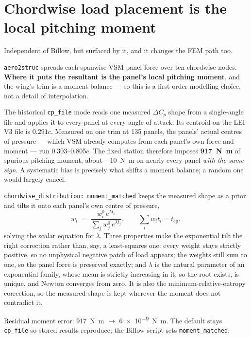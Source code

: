 \documentclass[11pt,a4paper]{article}
\newcommand{\code}[1]{\texttt{\small #1}}
\begin{document}
\section{Chordwise load placement is the local pitching moment}
\label{sec:chordwise}

Independent of Billow, but surfaced by it, and it changes the FEM path too.

\code{aero2struc} spreads each spanwise VSM panel force over ten chordwise
nodes. \textbf{Where it puts the resultant is the panel's local pitching
moment}, and the wing's trim is a moment balance --- so this is a first-order
modelling choice, not a detail of interpolation.

The historical \code{cp\_file} mode reads one measured $\Delta C_p$ shape from a
single-angle file and applies it to every panel at every angle of attack. Its
centroid on the LEI-V3 file is $0.291c$. Measured on one trim at 135 panels, the
panels' actual centres of pressure --- which VSM already computes from each
panel's own force and moment --- run \numrange{0.303}{0.805}$c$. The fixed
station therefore imposes \textbf{\SI{917}{\newton\metre}} of spurious pitching
moment, about \SI{-10}{\newton\metre} on nearly every panel \emph{with the same
sign}. A systematic bias is precisely what shifts a moment balance; a random one
would largely cancel.

\code{chordwise\_distribution: moment\_matched} keeps the measured shape as a
prior and tilts it onto each panel's own centre of pressure,
\begin{equation}
  w_i \;=\; \frac{w^0_i\,e^{\lambda t_i}}{\sum_j w^0_j\,e^{\lambda t_j}},
  \qquad \sum_i w_i t_i = t_{\mathrm{cp}},
\end{equation}
solving the scalar equation for $\lambda$. Three properties make the exponential
tilt the right correction rather than, say, a least-squares one: every weight
stays strictly positive, so no unphysical negative patch of load appears; the
weights still sum to one, so the panel force is preserved exactly; and $\lambda$
is the natural parameter of an exponential family, whose mean is strictly
increasing in it, so the root exists, is unique, and Newton converges from zero.
It is also the minimum-relative-entropy correction, so the measured shape is
kept wherever the moment does not contradict it.

Residual moment error: \SI{917}{\newton\metre} $\rightarrow$
\SI{6e-9}{\newton\metre}. The default stays \code{cp\_file} so stored results
reproduce; the Billow script sets \code{moment\_matched}.
\end{document}
